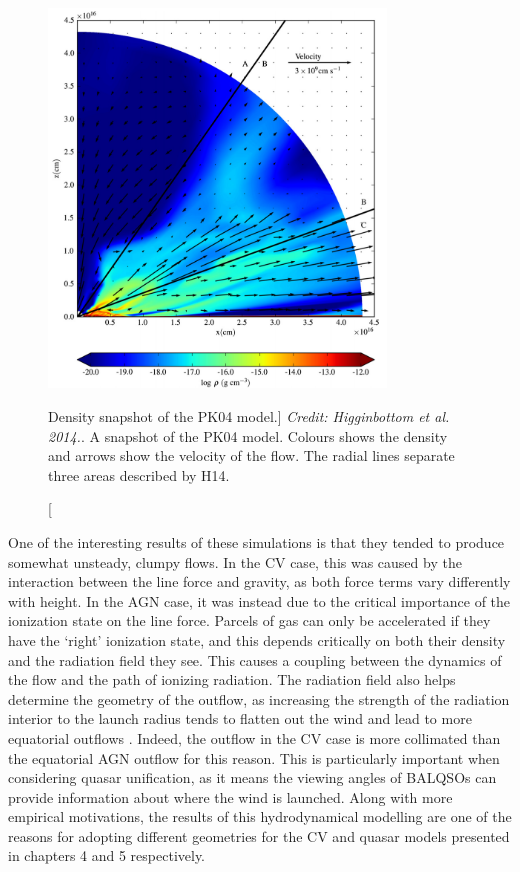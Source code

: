 \begin{figure}
\centering
\includegraphics[width=0.8\textwidth]{figures/02-outflows/pk04_h14.png}
\caption
[Density snapshot of the PK04 model.]
{
{\sl Credit: Higginbottom et al. 2014.}. 
A snapshot of the PK04 model. Colours shows the density and 
arrows show the velocity of the flow. 
The radial lines separate three areas described by H14.
} 
\label{fig:PK04}
\end{figure}

One of the interesting results of these  simulations is that they tended
to produce somewhat unsteady, clumpy flows. In the CV case, this was caused by
the interaction between the line force and gravity, as both force terms vary 
differently with height. In the AGN case, it was instead due to the critical
importance of the ionization state on the line force. Parcels of gas can only 
be accelerated if they have the `right' ionization state, and this depends
critically on both their density and the radiation field they see. This causes
a coupling between the dynamics of the flow and the path of ionizing radiation. 
The radiation field also helps
determine the geometry of the outflow, as increasing the strength of the radiation
interior to the launch radius tends to flatten out the wind and lead to more
equatorial outflows \citep{proga1998,proga2005}. Indeed, the outflow 
in the CV case is more collimated than the equatorial AGN outflow for this reason.
This is particularly important when considering quasar unification, as it means
the viewing angles of BALQSOs can provide information about where the wind is launched.
Along with more empirical motivations, the results of this hydrodynamical modelling
are one of the reasons for adopting different geometries for the CV and quasar 
models presented in chapters 4 and 5 respectively.

